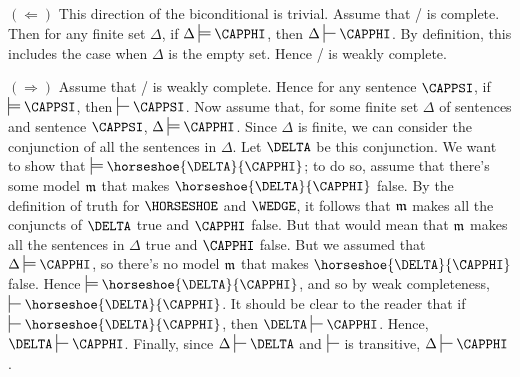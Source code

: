 \begin{PROOF}
	$(\Leftarrow)$ This direction of the biconditional is trivial. 
	Assume that \GSD{}/\GQD{} is complete. 
	Then for any finite set $\Delta$, if $\Delta\sdtstile{}{}\CAPPHI$, then $\Delta\sststile{}{}\CAPPHI$. 
	By definition, this includes the case when $\Delta$ is the empty set. 
	Hence \GSD{}/\GQD{} is weakly complete. 
	
	$(\Rightarrow)$ Assume that \GSD{}/\GQD{} is weakly complete. 
	Hence for any sentence $\CAPPSI$, if $\sdtstile{}{}\CAPPSI$, then $\sststile{}{}\CAPPSI$. 
	Now assume that, for some finite set $\Delta$ of sentences and sentence $\CAPPSI$, $\Delta\sdtstile{}{}\CAPPHI$.
	Since $\Delta$ is finite, we can consider the conjunction of all the sentences in $\Delta$.
	Let $\DELTA$ be this conjunction. 
	We want to show that $\sdtstile{}{}\horseshoe{\DELTA}{\CAPPHI}$;
	to do so, assume that there's some model $\mathfrak{m}$ that makes $\horseshoe{\DELTA}{\CAPPHI}$ false.
	By the definition of truth for $\HORSESHOE$ and $\WEDGE$, it follows that $\mathfrak{m}$ makes all the conjuncts of $\DELTA$ true and $\CAPPHI$ false. 
	But that would mean that $\mathfrak{m}$ makes all the sentences in $\Delta$ true and $\CAPPHI$ false.
	But we assumed that $\Delta\sdtstile{}{}\CAPPHI$, so there's no model $\mathfrak{m}$ that makes $\horseshoe{\DELTA}{\CAPPHI}$ false.
	Hence $\sdtstile{}{}\horseshoe{\DELTA}{\CAPPHI}$, and so by weak completeness, $\sststile{}{}\horseshoe{\DELTA}{\CAPPHI}$.
	It should be clear to the reader that if $\sststile{}{}\horseshoe{\DELTA}{\CAPPHI}$, then $\DELTA\sststile{}{}\CAPPHI$.
	Hence, $\DELTA\sststile{}{}\CAPPHI$.
	Finally, since $\Delta\sststile{}{}\DELTA$ and $\sststile{}{}$ is transitive, $\Delta\sststile{}{}\CAPPHI$.
\end{PROOF}
